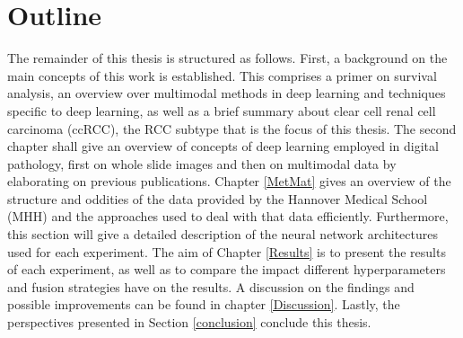 \section{Outline}

The remainder of this thesis is structured as follows. 
First, a background on the main concepts of this work is established. This comprises a primer on survival analysis, an overview over multimodal methods in deep learning and techniques specific to deep learning, as well as a brief summary about clear cell renal cell carcinoma (ccRCC), the RCC subtype that is the focus of this thesis. 
The second chapter shall give an overview of concepts of deep learning employed in digital pathology, first on whole slide images and then on multimodal data by elaborating on previous publications.
Chapter \ref{MetMat} gives an overview of the structure and oddities of the data provided by the Hannover Medical School (MHH) and the approaches used to deal with that data efficiently. Furthermore, this section will give a detailed description of the neural network architectures used for each experiment.
The aim of Chapter \ref{Results} is to present the results of each experiment, as well as to compare the impact different hyperparameters and fusion strategies have on the results.
A discussion on the findings and possible improvements can be found in chapter \ref{Discussion}. Lastly, the perspectives presented in Section \ref{conclusion} conclude this thesis.




